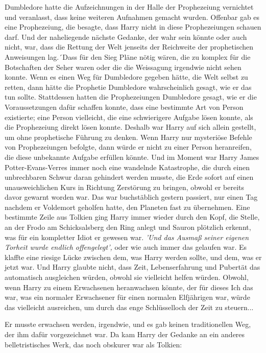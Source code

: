 Dumbledore hatte die Aufzeichnungen in der Halle der Prophezeiung vernichtet und
veranlasst, dass keine weiteren Aufnahmen gemacht wurden. Offenbar gab es eine
Prophezeiung, die besagte, dass Harry nicht in diese Prophezeiungen schauen
darf. Und der naheliegende nächste Gedanke, der wahr sein könnte oder auch
nicht, war, dass die Rettung der Welt jenseits der Reichweite der prophetischen
Anweisungen lag.´Dass für den Sieg Pläne nötig wären, die zu komplex für die
Botschaften der Seher waren oder die die Weissagung irgendwie nicht sehen
konnte. Wenn es einen Weg für Dumbledore gegeben hätte, die Welt selbst zu
retten, dann hätte die Prophetie Dumbledore wahrscheinlich gesagt, wie er das
tun sollte. Stattdessen hatten die Prophezeiungen Dumbledore gesagt, wie er die
Voraussetzungen dafür schaffen konnte, dass eine bestimmte Art von Person
existierte; eine Person vielleicht, die eine schwierigere Aufgabe lösen konnte,
als die Prophezeiung direkt lösen konnte. Deshalb war Harry auf sich allein
gestellt, um ohne prophetische Führung zu denken. Wenn Harry nur mysteriöse
Befehle von Prophezeiungen befolgte, dann würde er nicht zu einer Person
heranreifen, die diese unbekannte Aufgabe erfüllen könnte. Und im Moment war
Harry James Potter-Evans-Verres immer noch eine wandelnde Katastrophe, die durch
einen unbrechbaren Schwur daran gehindert werden musste, die Erde sofort auf
einen unausweichlichen Kurs in Richtung Zerstörung zu bringen, obwohl er bereits
davor gewarnt worden war. Das war buchstäblich gestern passiert, nur einen Tag
nachdem er Voldemort geholfen hatte, den Planeten fast zu übernehmen. Eine
bestimmte Zeile aus Tolkien ging Harry immer wieder durch den Kopf, die Stelle,
an der Frodo am Schicksalsberg den Ring anlegt und Sauron plötzlich erkennt, was
für ein kompletter Idiot er gewesen war.
\emph{'Und das Ausmaß seiner eigenen Torheit wurde endlich offengelegt',}
oder wie auch immer das gelaufen war. Es klaffte eine riesige Lücke zwischen
dem, was Harry werden sollte, und dem, was er jetzt war. Und Harry glaubte
nicht, dass Zeit, Lebenserfahrung und Pubertät das automatisch ausgleichen
würden, obwohl sie vielleicht helfen würden. Obwohl, wenn Harry zu einem
Erwachsenen heranwachsen könnte, der für dieses Ich das war, was ein normaler
Erwachsener für einen normalen Elfjährigen war, würde das vielleicht ausreichen,
um durch das enge Schlüsselloch der Zeit zu steuern...

Er musste erwachsen werden, irgendwie, und es gab keinen traditionellen Weg, der
ihm dafür vorgezeichnet war. Da kam Harry der Gedanke an ein anderes
belletristisches Werk, das noch obskurer war als Tolkien:

